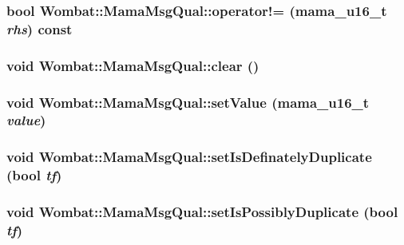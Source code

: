 \label{classWombat_1_1MamaMsgQual_abf7019cb1c95421816e3b31791657579}
\hypertarget{classWombat_1_1MamaMsgQual_a9f972264728cb00e2ee69ec12c5f3022}{
\subsubsection[{operator!=}]{\setlength{\rightskip}{0pt plus 5cm}bool Wombat::MamaMsgQual::operator!= (mama\_\-u16\_\-t {\em rhs}) const}}
\label{classWombat_1_1MamaMsgQual_a9f972264728cb00e2ee69ec12c5f3022}
\hypertarget{classWombat_1_1MamaMsgQual_a88234633f34557311d4fdd3554a1b10d}{
\subsubsection[{clear}]{\setlength{\rightskip}{0pt plus 5cm}void Wombat::MamaMsgQual::clear ()}}
\label{classWombat_1_1MamaMsgQual_a88234633f34557311d4fdd3554a1b10d}
\hypertarget{classWombat_1_1MamaMsgQual_ab2db46e3928e4e964ac24030b52a8539}{
\subsubsection[{setValue}]{\setlength{\rightskip}{0pt plus 5cm}void Wombat::MamaMsgQual::setValue (mama\_\-u16\_\-t {\em value})}}
\label{classWombat_1_1MamaMsgQual_ab2db46e3928e4e964ac24030b52a8539}
\hypertarget{classWombat_1_1MamaMsgQual_a6a0e738d4e6ad9eb6346fb49cc4c6eb6}{
\subsubsection[{setIsDefinatelyDuplicate}]{\setlength{\rightskip}{0pt plus 5cm}void Wombat::MamaMsgQual::setIsDefinatelyDuplicate (bool {\em tf})}}
\label{classWombat_1_1MamaMsgQual_a6a0e738d4e6ad9eb6346fb49cc4c6eb6}
\hypertarget{classWombat_1_1MamaMsgQual_aee0b5012d3ed45fa27c6d00f20f533d2}{
\subsubsection[{setIsPossiblyDuplicate}]{\setlength{\rightskip}{0pt plus 5cm}void Wombat::MamaMsgQual::setIsPossiblyDuplicate (bool {\em tf})}}
